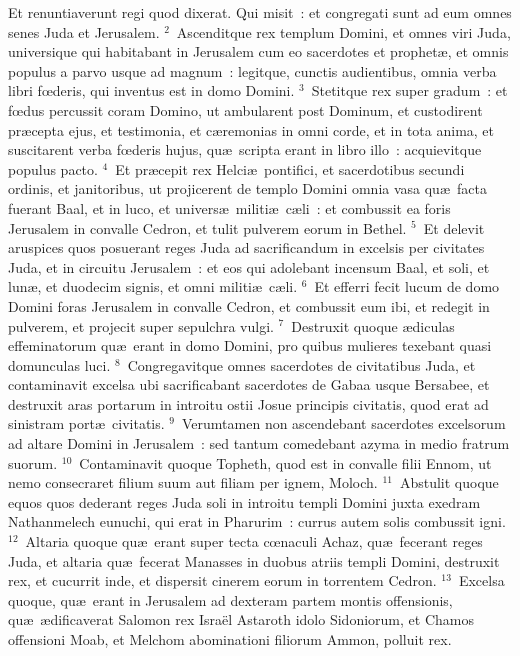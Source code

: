 \bchapter
\lettrine[lines=3,image=true,loversize=0.05,lraise=-0.03]{E}{}t renuntiaverunt regi quod dixerat. Qui misit~: et congregati sunt ad eum omnes senes Juda et Jerusalem.
${}^{2}$~Ascenditque rex templum Domini, et omnes viri Juda, universique qui habitabant in Jerusalem cum eo sacerdotes et prophet\ae , et omnis populus a parvo usque ad magnum~: legitque, cunctis audientibus, omnia verba libri fœderis, qui inventus est in domo Domini.
${}^{3}$~Stetitque rex super gradum~: et fœdus percussit coram Domino, ut ambularent post Dominum, et custodirent pr\ae cepta ejus, et testimonia, et c\ae remonias in omni corde, et in tota anima, et suscitarent verba fœderis hujus, qu\ae\ scripta erant in libro illo~: acquievitque populus pacto.
${}^{4}$~Et pr\ae cepit rex Helci\ae\ pontifici, et sacerdotibus secundi ordinis, et janitoribus, ut projicerent de templo Domini omnia vasa qu\ae\ facta fuerant Baal, et in luco, et univers\ae\ militi\ae\ c\ae li~: et combussit ea foris Jerusalem in convalle Cedron, et tulit pulverem eorum in Bethel.
${}^{5}$~Et delevit aruspices quos posuerant reges Juda ad sacrificandum in excelsis per civitates Juda, et in circuitu Jerusalem~: et eos qui adolebant incensum Baal, et soli, et lun\ae , et duodecim signis, et omni militi\ae\ c\ae li.
${}^{6}$~Et efferri fecit lucum de domo Domini foras Jerusalem in convalle Cedron, et combussit eum ibi, et redegit in pulverem, et projecit super sepulchra vulgi.
${}^{7}$~Destruxit quoque \ae diculas effeminatorum qu\ae\ erant in domo Domini, pro quibus mulieres texebant quasi domunculas luci.
${}^{8}$~Congregavitque omnes sacerdotes de civitatibus Juda, et contaminavit excelsa ubi sacrificabant sacerdotes de Gabaa usque Bersabee, et destruxit aras portarum in introitu ostii Josue principis civitatis, quod erat ad sinistram port\ae\ civitatis.
${}^{9}$~Verumtamen non ascendebant sacerdotes excelsorum ad altare Domini in Jerusalem~: sed tantum comedebant azyma in medio fratrum suorum.
${}^{10}$~Contaminavit quoque Topheth, quod est in convalle filii Ennom, ut nemo consecraret filium suum aut filiam per ignem, Moloch.
${}^{11}$~Abstulit quoque equos quos dederant reges Juda soli in introitu templi Domini juxta exedram Nathanmelech eunuchi, qui erat in Pharurim~: currus autem solis combussit igni.
${}^{12}$~Altaria quoque qu\ae\ erant super tecta cœnaculi Achaz, qu\ae\ fecerant reges Juda, et altaria qu\ae\ fecerat Manasses in duobus atriis templi Domini, destruxit rex, et cucurrit inde, et dispersit cinerem eorum in torrentem Cedron.
${}^{13}$~Excelsa quoque, qu\ae\ erant in Jerusalem ad dexteram partem montis offensionis, qu\ae\ \ae dificaverat Salomon rex Isra\"el Astaroth idolo Sidoniorum, et Chamos offensioni Moab, et Melchom abominationi filiorum Ammon, polluit rex.
